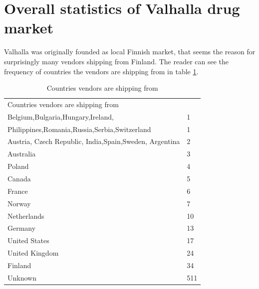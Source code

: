 \documentclass[
  digital, %
  table,   %
  lof,     %
  lot,     %
  oneside
]{fithesis3}
\begin{document}
\section{Overall statistics of Valhalla drug market}

Valhalla was originally founded as local Finnish market,
that seems the reason for surprisingly many vendors shipping from Finland.
The reader can see the frequency of countries the vendors are shipping from in table \ref{shipcount}.

\begin{table}
    \caption{Countries vendors are shipping from}
    \label{shipcount}
    \begin{tabular}{|l|l|}
    Countries vendors are shipping from\\
      Belgium,Bulgaria,Hungary,Ireland, & 1\\
      Philippines,Romania,Russia,Serbia,Switzerland& 1   \\
        Austria, Czech Republic, India,Spain,Sweden, Argentina  & 2   \\
        Australia                                    & 3   \\ 
        Poland                                       & 4   \\ 
        Canada                                       & 5   \\ 
        France                                       & 6   \\ 
        Norway                                       & 7   \\ 
        Netherlands                                  & 10  \\ 
        Germany                                      & 13  \\ 
        United States                                & 17  \\ 
        United Kingdom                               & 24  \\ 
        Finland                                      & 34  \\ 
        Unknown                                      & 511  
    \end{tabular}
\end{table}
\end{document}
